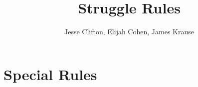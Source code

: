 \documentclass{article}
\title{Struggle Rules}
\author{Jesse Clifton, Elijah Cohen, James Krause}
\begin{document}
\maketitle

\newpage




\newpage

\section*{Special Rules}


\
\

\newpage

\newpage

\
\

\
\

\newpage

\newpage

\newpage

\end{document}
